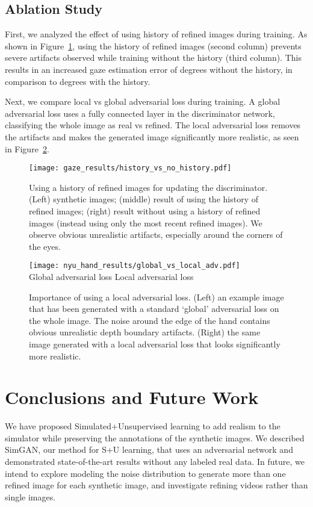 \documentclass[10pt,twocolumn,letterpaper]{article}
\begin{document}
\subsection{Ablation Study}

First, we analyzed the effect of using history of refined images during training. As shown in Figure~\ref{fig:history_vs_noHistory}, using the history of refined images (second column) prevents severe artifacts observed while training without the history (third column). 
This results in an increased gaze estimation error of  degrees without the history, in comparison to  degrees with the history.


Next, we compare local vs global adversarial loss during training. A global adversarial loss uses a fully connected layer in the discriminator network, classifying the whole image as real vs refined. The local adversarial loss removes the artifacts and makes the generated image significantly more realistic, as seen in Figure~\ref{fig:global_vs_local}.


\begin{figure}
\centering
\texttt{[image: gaze\_results/history\_vs\_no\_history.pdf]} \\
\caption{Using a history of refined images for updating the discriminator. 
(Left) synthetic images; (middle) result of using the history of refined images; (right) result without using a history of refined images (instead using only the most recent refined images). 
We observe obvious unrealistic artifacts, especially around the corners of the eyes.
}
\label{fig:history_vs_noHistory}
\end{figure}

 \begin{figure}
\centering


\texttt{[image: nyu\_hand\_results/global\_vs\_local\_adv.pdf]} \\
\vskip-0.05in
Global adversarial loss \hskip0.1in Local adversarial loss 
\vskip1pt
\caption{Importance of using a local adversarial loss. 
(Left) an example image that has been generated with a standard `global' adversarial loss on the whole image. 
The noise around the edge of the hand contains obvious unrealistic depth boundary artifacts. 
(Right) the same image generated with a local adversarial loss that looks significantly more realistic. 
}
\label{fig:global_vs_local}
\end{figure}



\section{Conclusions and Future Work}
We have proposed Simulated+Unsupervised learning to add realism to the simulator while preserving the annotations of the synthetic images.
We described SimGAN, our method for S+U learning, that uses an adversarial network and demonstrated state-of-the-art results without any labeled real data. 
In future, we intend to explore modeling the noise distribution to generate more than one refined image for each synthetic image, and investigate refining videos rather than single images. 
\end{document}
